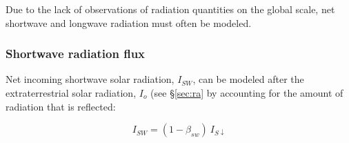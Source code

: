 \noindent Due to the lack of observations of radiation quantities on the global scale, net shortwave and longwave radiation must often be modeled.

\subsubsection{Shortwave radiation flux}
\label{sec:rs}
Net incoming shortwave solar radiation, $I_{SW}$, can be modeled after the extraterrestrial solar radiation, $I_o$ (see \S \ref{sec:ra} by accounting for the amount of radiation that is reflected:

\begin{equation}
\label{eq:rns}
	I_{SW} = \left(1 - \beta_{sw}\right)\: I_{S\downarrow}
\end{equation}

